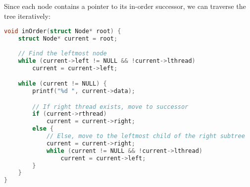 Since each node contains a pointer to its in-order successor,
we can traverse the tree iteratively:

\begin{lstlisting}[language=C]
void inOrder(struct Node* root) {
    struct Node* current = root;
    
    // Find the leftmost node
    while (current->left != NULL && !current->lthread) 
        current = current->left;

    while (current != NULL) {
        printf("%d ", current->data);

        // If right thread exists, move to successor
        if (current->rthread)
            current = current->right;
        else {
            // Else, move to the leftmost child of the right subtree
            current = current->right;
            while (current != NULL && !current->lthread)
                current = current->left;
        }
    }
}
\end{lstlisting}